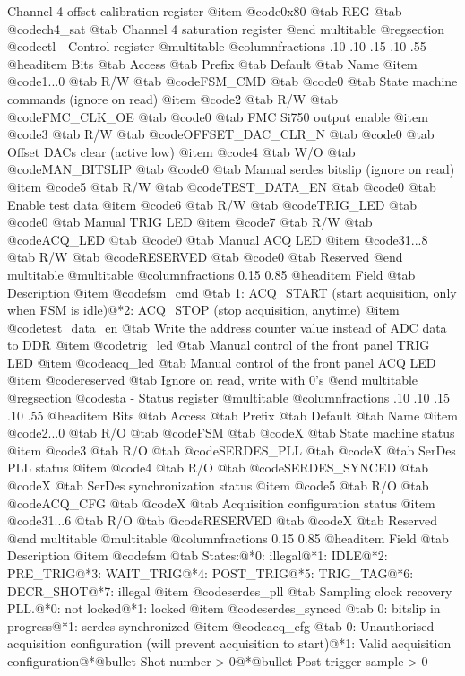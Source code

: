 Channel 4 offset calibration register
@item @code{0x80} @tab
REG @tab
@code{ch4_sat} @tab
Channel 4 saturation register
@end multitable 
@regsection @code{ctl} - Control register
@multitable @columnfractions .10 .10 .15 .10 .55
@headitem Bits @tab Access @tab Prefix @tab Default @tab Name
@item @code{1...0}
@tab R/W @tab
@code{FSM_CMD}
@tab @code{0} @tab 
State machine commands (ignore on read)
@item @code{2}
@tab R/W @tab
@code{FMC_CLK_OE}
@tab @code{0} @tab 
FMC Si750 output enable
@item @code{3}
@tab R/W @tab
@code{OFFSET_DAC_CLR_N}
@tab @code{0} @tab 
Offset DACs clear (active low)
@item @code{4}
@tab W/O @tab
@code{MAN_BITSLIP}
@tab @code{0} @tab 
Manual serdes bitslip (ignore on read)
@item @code{5}
@tab R/W @tab
@code{TEST_DATA_EN}
@tab @code{0} @tab 
Enable test data
@item @code{6}
@tab R/W @tab
@code{TRIG_LED}
@tab @code{0} @tab 
Manual TRIG LED
@item @code{7}
@tab R/W @tab
@code{ACQ_LED}
@tab @code{0} @tab 
Manual ACQ LED
@item @code{31...8}
@tab R/W @tab
@code{RESERVED}
@tab @code{0} @tab 
Reserved
@end multitable
@multitable @columnfractions 0.15 0.85
@headitem Field @tab Description
@item @code{fsm_cmd} @tab 1: ACQ_START (start acquisition, only when FSM is idle)@*2: ACQ_STOP (stop acquisition, anytime)
@item @code{test_data_en} @tab Write the address counter value instead of ADC data to DDR
@item @code{trig_led} @tab Manual control of the front panel TRIG LED
@item @code{acq_led} @tab Manual control of the front panel ACQ LED
@item @code{reserved} @tab Ignore on read, write with 0's
@end multitable
@regsection @code{sta} - Status register
@multitable @columnfractions .10 .10 .15 .10 .55
@headitem Bits @tab Access @tab Prefix @tab Default @tab Name
@item @code{2...0}
@tab R/O @tab
@code{FSM}
@tab @code{X} @tab 
State machine status
@item @code{3}
@tab R/O @tab
@code{SERDES_PLL}
@tab @code{X} @tab 
SerDes PLL status
@item @code{4}
@tab R/O @tab
@code{SERDES_SYNCED}
@tab @code{X} @tab 
SerDes synchronization status
@item @code{5}
@tab R/O @tab
@code{ACQ_CFG}
@tab @code{X} @tab 
Acquisition configuration status
@item @code{31...6}
@tab R/O @tab
@code{RESERVED}
@tab @code{X} @tab 
Reserved
@end multitable
@multitable @columnfractions 0.15 0.85
@headitem Field @tab Description
@item @code{fsm} @tab States:@*0: illegal@*1: IDLE@*2: PRE_TRIG@*3: WAIT_TRIG@*4: POST_TRIG@*5: TRIG_TAG@*6: DECR_SHOT@*7: illegal
@item @code{serdes_pll} @tab Sampling clock recovery PLL.@*0: not locked@*1: locked
@item @code{serdes_synced} @tab 0: bitslip in progress@*1: serdes synchronized
@item @code{acq_cfg} @tab 0: Unauthorised acquisition configuration (will prevent acquisition to start)@*1: Valid acquisition configuration@*@bullet{}  Shot number > 0@*@bullet{}  Post-trigger sample > 0
